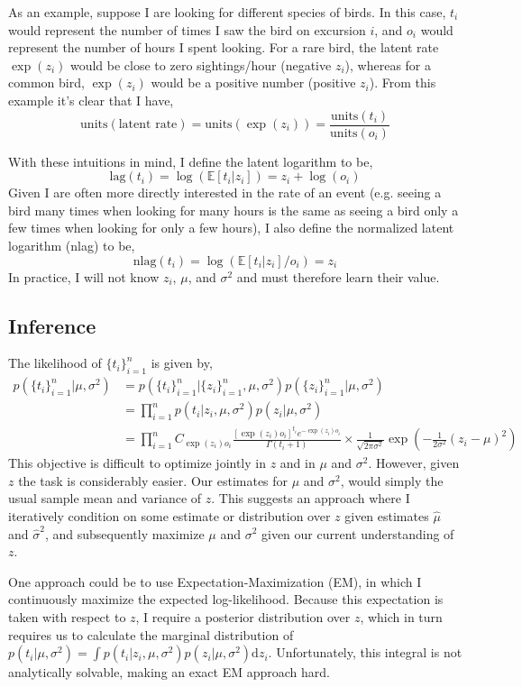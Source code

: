 \documentclass[11pt]{article}
\begin{document}
As an example, suppose I are looking for different species of birds. In this case, $t_i$ would represent the number of times I saw the bird on excursion $i$, and $o_i$ would represent the number of hours I spent looking. For a rare bird, the latent rate $\exp(z_i)$ would be close to zero sightings/hour (negative $z_i$), whereas for a common bird, $\exp(z_i)$ would be a positive number (positive $z_i$). From this example it's clear that I have,
\[
\textrm{units}(\textrm{latent rate}) = \textrm{units}(\exp(z_i)) = \frac{ \textrm{units}(t_i)}{ \textrm{units}(o_i)}
\]

With these intuitions in mind, I define the latent logarithm to be,
\[
\textrm{lag}(t_i) = \log(\mathbb{E}[t_i|z_i]) = z_i + \log(o_i)
\]
Given I are often more directly interested in the rate of an event (e.g. seeing a bird many times when looking for many hours is the same as seeing a bird only a few times when looking for only a few hours), I also define the normalized latent logarithm (nlag) to be, 
\[
\textrm{nlag}(t_i) = \log(\mathbb{E}[t_i|z_i]/o_i) = z_i
\]
In practice, I will not know $z_i$, $\mu$, and $\sigma^2$ and must therefore learn their value.

\subsection{Inference}

The likelihood of $\{t_i\}_{i=1}^n$ is given by,
\begin{align*}
p(\{t_i\}_{i=1}^n | \mu, \sigma^2) & = p(\{t_i\}_{i=1}^n | \{z_i\}_{i=1}^n, \mu, \sigma^2)  p(\{z_i\}_{i=1}^n |\mu, \sigma^2)\\
& = \prod_{i=1}^n p(t_i | z_i, \mu, \sigma^2) p(z_i | \mu, \sigma^2) \\
& = \prod_{i=1}^n C_{\exp(z_i)o_i} \frac{ [\exp(z_i)o_i]^{t_i} e^{-\exp(z_i)o_i}}{\Gamma(t_i + 1)} \times \frac{1}{\sqrt{2\pi\sigma^2}} \exp\left( -\frac{1}{2\sigma^2}(z_i - \mu)^2 \right) 
\end{align*}
This objective is difficult to optimize jointly in $z$ and in $\mu$ and $\sigma^2$. However, given $z$ the task is considerably easier. Our estimates for $\mu$ and $\sigma^2$, would simply the usual sample mean and variance of $z$. This suggests an approach where I iteratively condition on some estimate or distribution over $z$ given estimates $\hat{\mu}$ and $\hat{\sigma}^2$, and subsequently maximize $\mu$ and $\sigma^2$ given our current understanding of $z$.

One approach could be to use Expectation-Maximization (EM), in which I continuously maximize the expected log-likelihood. Because this expectation is taken with respect to $z$, I require a posterior distribution over $z$, which in turn requires us to calculate the marginal distribution of $p(t_i | \mu, \sigma^2) = \int p(t_i | z_i, \mu, \sigma^2)p(z_i | \mu, \sigma^2) \textrm{d}z_i$. Unfortunately, this integral is not analytically solvable, making an exact EM approach hard.
\end{document}
